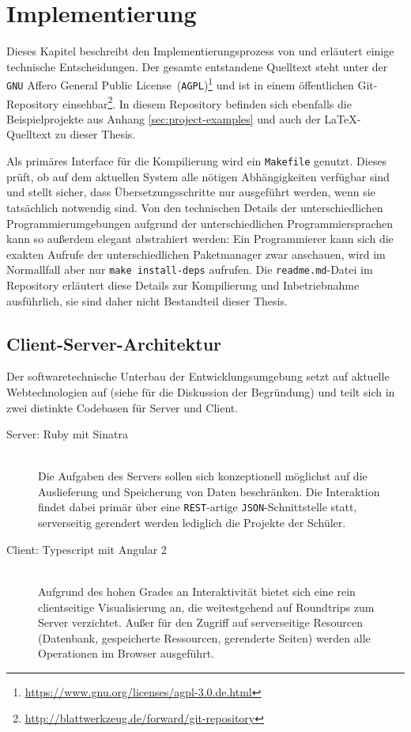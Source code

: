 \section{Implementierung}
\label{sec:implementation-analysis}

Dieses Kapitel beschreibt den Implementierungsprozess von \idename{} und erläutert einige technische Entscheidungen. Der gesamte entstandene Quelltext steht unter der \texttt{GNU} Affero General Public License~(\texttt{AGPL})\footnote{\url{https://www.gnu.org/licenses/agpl-3.0.de.html}} und ist in einem öffentlichen Git-Repository einsehbar\footnote{\url{http://blattwerkzeug.de/forward/git-repository}}. In diesem Repository befinden sich ebenfalls die Beispielprojekte aus Anhang \ref{sec:project-examples} und auch der \LaTeX-Quelltext zu dieser Thesis.

Als primäres Interface für die Kompilierung wird ein \texttt{Makefile} genutzt. Dieses prüft, ob auf dem aktuellen System alle nötigen Abhängigkeiten verfügbar sind und stellt sicher, dass Übersetzungsschritte nur ausgeführt werden, wenn sie tatsächlich notwendig sind. Von den technischen Details der unterschiedlichen Programmierumgebungen aufgrund der unterschiedlichen Programmiersprachen kann so außerdem elegant abstrahiert werden: Ein Programmierer kann sich die exakten Aufrufe der unterschiedlichen Paketmanager zwar anschauen, wird im Normallfall aber nur \texttt{make install-deps} aufrufen. Die \texttt{readme.md}-Datei im Repository erläutert diese Details zur Kompilierung und Inbetriebnahme ausführlich, sie sind daher nicht Bestandteil dieser Thesis. 

\subsection{Client-Server-Architektur}
\label{sec:implementation-client-server}

Der softwaretechnische Unterbau der Entwicklungsumgebung setzt auf aktuelle Webtechnologien auf (siehe  für die Diskussion der Begründung) und teilt sich in zwei distinkte Codebasen für Server und Client.

\begin{description}
\item[Server: Ruby mit Sinatra] \hfill\\
  Die Aufgaben des Servers sollen sich konzeptionell möglichst auf die Auslieferung und Speicherung von Daten beschränken. Die Interaktion findet dabei primär über eine \texttt{REST}-artige \texttt{JSON}-Schnittstelle statt, serverseitig gerendert werden lediglich die Projekte der Schüler.
\item[Client: Typescript mit Angular 2] \hfill\\
  Aufgrund des hohen Grades an Interaktivität bietet sich eine rein clientseitige Visualisierung an, die weitestgehend auf Roundtrips zum Server verzichtet. Außer für den Zugriff auf serverseitige Resourcen (Datenbank, gespeicherte Ressourcen, gerenderte Seiten) werden alle Operationen im Browser ausgeführt.
\end{description}

